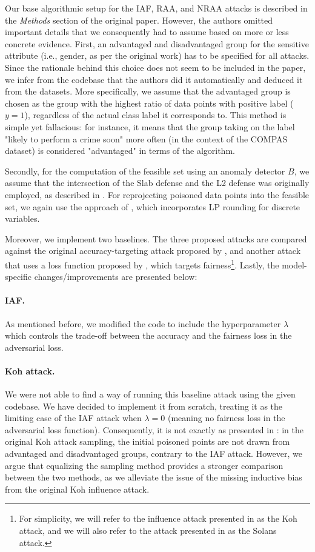 Our base algorithmic setup for the IAF, RAA, and NRAA attacks is described in the \textit{Methods} section of the original paper. However, the authors omitted important details that we consequently had to assume based on more or less concrete evidence. First, an advantaged and disadvantaged group for the sensitive attribute (i.e., gender, as per the original work) has to be specified for all attacks. Since the rationale behind this choice does not seem to be included in the paper, we infer from the codebase that the authors did it automatically and deduced it from the datasets. More specifically, we assume that the advantaged group is chosen as the group with the highest ratio of data points with positive label ($y=1$), regardless of the actual class label it corresponds to.  This method is simple yet fallacious: for instance, it means that the group taking on the label "likely to perform a crime soon" more often (in the context of the COMPAS dataset) is considered "advantaged" in terms of the algorithm. 

Secondly, for the computation of the feasible set using an anomaly detector $B$, we assume that the intersection of the Slab defense and the L2 defense was originally employed, as described in . For reprojecting poisoned data points into the feasible set, we again use the approach of \citep{koh2018}, which incorporates LP rounding for discrete variables.

Moreover, we implement two baselines. The three proposed attacks are compared against the original accuracy-targeting attack proposed by , and another attack that uses a loss function proposed by , which targets fairness\footnote{For simplicity, we will refer to the influence attack presented in \citep{koh2018} as the Koh attack, and we will also refer to the attack presented in \citep{solans2020} as the Solans attack.}. Lastly, the model-specific changes/improvements are presented below:

\paragraph{IAF.} As mentioned before, we modified the code to include the hyperparameter $\lambda$ which controls the trade-off between the accuracy and the fairness loss in the adversarial loss.

\paragraph{Koh attack.} We were not able to find a way of running this baseline attack using the given codebase. We have decided to implement it from scratch, treating it as the limiting case of the IAF attack when $\lambda=0$ (meaning no fairness loss in the adversarial loss function). Consequently, it is not exactly as presented in \cite{koh2018}: in the original Koh attack sampling, the initial poisoned points are not drawn from advantaged and disadvantaged groups, contrary to the IAF attack. However, we argue that equalizing the sampling method provides a stronger comparison between the two methods, as we alleviate the issue of the missing inductive bias from the original Koh influence attack.  

